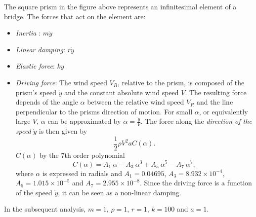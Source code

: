 \noindent The square prism in the figure above represents an infinitesimal
element of a bridge. The forces that act on the element are:
\begin{itemize}

\item \textit{Inertia} : $m \ddot{y}$

\item \textit{Linear damping}: $r \dot{y}$

\item \textit{Elastic force}: $k y$

\item \textit{Driving force}: The wind speed $V_R$, relative to the prism, is composed of the prism's speed $\dot{y}$ and the constant absolute wind speed $V$. The resulting force depends of the angle $\alpha$ between the relative wind speed $V_R$ and the line perpendicular to the prisms direction of motion. For small $\alpha$, or equivalently large $V$, $\alpha$ can be approximated by $\alpha=\frac{\dot{y}}{V}$. The force along the \textit{direction of the speed} $\dot{y}$ is then given by
\[\frac{1}{2} {\rho V^2 a C(\alpha)}. \]
 $C(\alpha)$ by the 7th order polynomial
\[C(\alpha)= A_1 \ \alpha - A_3 \ \alpha^3 + A_5 \ \alpha^5 - A_7 \ \alpha^7, \]
where $\alpha$ is expressed in radials and $A_1=0.04695$,
$A_3=8.932 \times 10^{-4}$, $A_5=1.015 \times 10^{-5}$ and $A_7=2.955 \times 10^{-8}$. Since the
driving force is a function of the speed $\dot{y}$, it can be seen
as a non-linear damping.
\end{itemize}

\noindent In the subsequent analysis,  $m=1$, $\rho=1$, $r=1$, $k=100$ and $a=1$.

